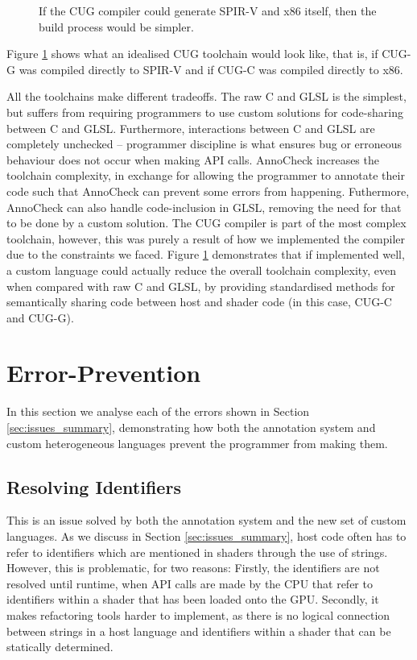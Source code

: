 \documentclass[a4paper,12pt,twoside,openright]{report}
\begin{document}
\begin{figure}[h]
\centering
\def\svgwidth{0.8\linewidth}

\caption{If the CUG compiler could generate SPIR-V and x86 itself, then the build
process would be simpler.}
\label{fig:pipeline_cug_future}
\end{figure}

Figure \ref{fig:pipeline_cug_future} shows what an idealised CUG toolchain
would look like, that is, if CUG-G was compiled directly to SPIR-V and if CUG-C
was compiled directly to x86.

All the toolchains make different tradeoffs. The raw C and GLSL is the
simplest, but suffers from requiring programmers to use custom solutions for
code-sharing between C and GLSL. Furthermore, interactions between C and GLSL
are completely unchecked -- programmer discipline is what ensures bug or
erroneous behaviour does not occur when making API calls. AnnoCheck increases
the toolchain complexity, in exchange for allowing the programmer to annotate
their code such that AnnoCheck can prevent some errors from happening.
Futhermore, AnnoCheck can also handle code-inclusion in GLSL, removing the need
for that to be done by a custom solution. The CUG compiler is part of the most
complex toolchain, however, this was purely a result of how we implemented the
compiler due to the constraints we faced. Figure \ref{fig:pipeline_cug_future}
demonstrates that if implemented well, a custom language could actually reduce
the overall toolchain complexity, even when compared with raw C and GLSL, by
providing standardised methods for semantically sharing code between host and
shader code (in this case, CUG-C and CUG-G).

\section{Error-Prevention}

In this section we analyse each of the errors shown in Section
\ref{sec:issues_summary}, demonstrating how both the annotation system and
custom heterogeneous languages prevent the programmer from making them.

\subsection{Resolving Identifiers}

This is an issue solved by both the annotation system and the new set of custom
languages. As we discuss in Section \ref{sec:issues_summary}, host code often
has to refer to identifiers which are mentioned in shaders through the use of
strings. However, this is problematic, for two reasons: Firstly, the
identifiers are not resolved until runtime, when API calls are made by the CPU
that refer to identifiers within a shader that has been loaded onto the GPU.
Secondly, it makes refactoring tools harder to implement, as there is no
logical connection between strings in a host language and identifiers within a
shader that can be statically determined.
\end{document}
